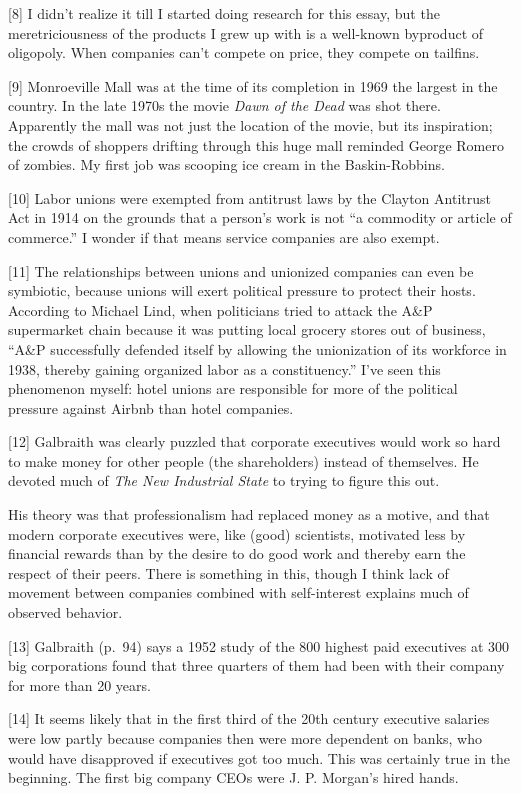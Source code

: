 {[}8{]} I didn't realize it till I started doing research for this
essay, but the meretriciousness of the products I grew up with is a
well-known byproduct of oligopoly. When companies can't compete on
price, they compete on tailfins.

{[}9{]} Monroeville Mall was at the time of its completion in 1969 the
largest in the country. In the late 1970s the movie \emph{Dawn of the
Dead} was shot there. Apparently the mall was not just the location of
the movie, but its inspiration; the crowds of shoppers drifting through
this huge mall reminded George Romero of zombies. My first job was
scooping ice cream in the Baskin-Robbins.

{[}10{]} Labor unions were exempted from antitrust laws by the Clayton
Antitrust Act in 1914 on the grounds that a person's work is not ``a
commodity or article of commerce.'' I wonder if that means service
companies are also exempt.

{[}11{]} The relationships between unions and unionized companies can
even be symbiotic, because unions will exert political pressure to
protect their hosts. According to Michael Lind, when politicians tried
to attack the A\&P supermarket chain because it was putting local
grocery stores out of business, ``A\&P successfully defended itself by
allowing the unionization of its workforce in 1938, thereby gaining
organized labor as a constituency.'' I've seen this phenomenon myself:
hotel unions are responsible for more of the political pressure against
Airbnb than hotel companies.

{[}12{]} Galbraith was clearly puzzled that corporate executives would
work so hard to make money for other people (the shareholders) instead
of themselves. He devoted much of \emph{The New Industrial State} to
trying to figure this out.

His theory was that professionalism had replaced money as a motive, and
that modern corporate executives were, like (good) scientists, motivated
less by financial rewards than by the desire to do good work and thereby
earn the respect of their peers. There is something in this, though I
think lack of movement between companies combined with self-interest
explains much of observed behavior.

{[}13{]} Galbraith (p.~94) says a 1952 study of the 800 highest paid
executives at 300 big corporations found that three quarters of them had
been with their company for more than 20 years.

{[}14{]} It seems likely that in the first third of the 20th century
executive salaries were low partly because companies then were more
dependent on banks, who would have disapproved if executives got too
much. This was certainly true in the beginning. The first big company
CEOs were J. P. Morgan's hired hands.

